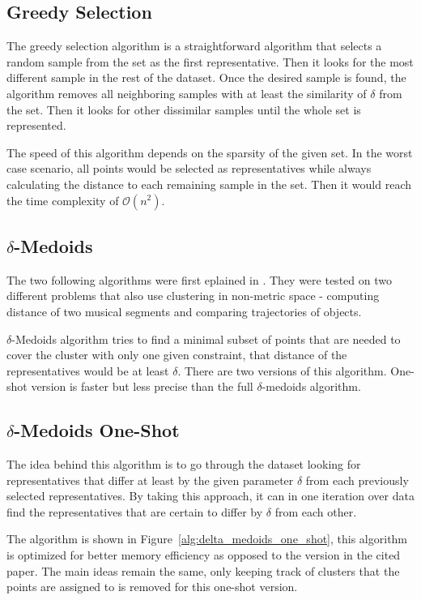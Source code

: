 \documentclass[thesis=B,english]{FITthesis}[2012/10/20]
\begin{document}
\subsection{Greedy Selection}\label{subsec:greedy_select}
The greedy selection algorithm is a straightforward algorithm that selects a random sample from the set as the first representative.
Then it looks for the most different sample in the rest of the dataset.
Once the desired sample is found, the algorithm removes all neighboring samples with at least the similarity of $\delta$ from the set.
Then it looks for other dissimilar samples until the whole set is represented.

The speed of this algorithm depends on the sparsity of the given set.
In the worst case scenario, all points would be selected as representatives while always calculating the distance to each remaining sample in the set. Then it would reach the time complexity of $\mathcal{O}(n^2)$.

\subsection{$\delta$-Medoids}\label{subsec:delta_medoids}
The two following algorithms were first eplained in \cite{liebman2015representative}.
They were tested on two different problems that also use clustering in non-metric space - computing distance of two musical segments and comparing trajectories of objects.

$\delta$-Medoids algorithm tries to find a minimal subset of points that are needed to cover the cluster with only one given constraint, that distance of the representatives would be at least $\delta$.
There are two versions of this algorithm.
One-shot version is faster but less precise than the full $\delta$-medoids algorithm.

\subsection{$\delta$-Medoids One-Shot}

The idea behind this algorithm is to go through the dataset looking for representatives that differ at least by the given parameter $\delta$ from each previously selected representatives.
By taking this approach, it can in one iteration over data find the representatives that are certain to differ by $\delta$ from each other.

The algorithm is shown in Figure~\ref{alg:delta_medoids_one_shot}, this algorithm is optimized for better memory efficiency as opposed to the version in the cited paper.
The main ideas remain the same, only keeping track of clusters that the points are assigned to is removed for this one-shot version.
\end{document}
